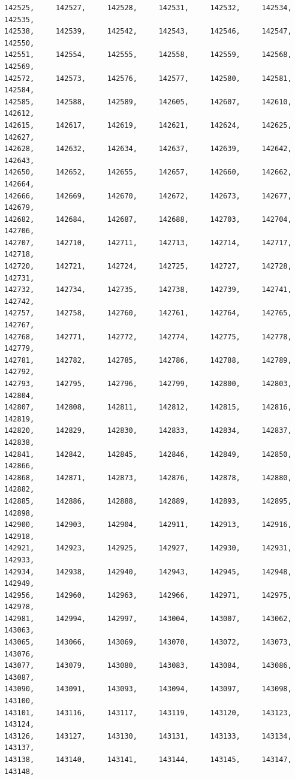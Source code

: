 \documentclass[a4paper,11pt]{report}
\begin{document}
\begin{verbatim}
142525,     142527,     142528,     142531,     142532,     142534,     142535,
142538,     142539,     142542,     142543,     142546,     142547,     142550,
142551,     142554,     142555,     142558,     142559,     142568,     142569,
142572,     142573,     142576,     142577,     142580,     142581,     142584,
142585,     142588,     142589,     142605,     142607,     142610,     142612,
142615,     142617,     142619,     142621,     142624,     142625,     142627,
142628,     142632,     142634,     142637,     142639,     142642,     142643,
142650,     142652,     142655,     142657,     142660,     142662,     142664,
142666,     142669,     142670,     142672,     142673,     142677,     142679,
142682,     142684,     142687,     142688,     142703,     142704,     142706,
142707,     142710,     142711,     142713,     142714,     142717,     142718,
142720,     142721,     142724,     142725,     142727,     142728,     142731,
142732,     142734,     142735,     142738,     142739,     142741,     142742,
142757,     142758,     142760,     142761,     142764,     142765,     142767,
142768,     142771,     142772,     142774,     142775,     142778,     142779,
142781,     142782,     142785,     142786,     142788,     142789,     142792,
142793,     142795,     142796,     142799,     142800,     142803,     142804,
142807,     142808,     142811,     142812,     142815,     142816,     142819,
142820,     142829,     142830,     142833,     142834,     142837,     142838,
142841,     142842,     142845,     142846,     142849,     142850,     142866,
142868,     142871,     142873,     142876,     142878,     142880,     142882,
142885,     142886,     142888,     142889,     142893,     142895,     142898,
142900,     142903,     142904,     142911,     142913,     142916,     142918,
142921,     142923,     142925,     142927,     142930,     142931,     142933,
142934,     142938,     142940,     142943,     142945,     142948,     142949,
142956,     142960,     142963,     142966,     142971,     142975,     142978,
142981,     142994,     142997,     143004,     143007,     143062,     143063,
143065,     143066,     143069,     143070,     143072,     143073,     143076,
143077,     143079,     143080,     143083,     143084,     143086,     143087,
143090,     143091,     143093,     143094,     143097,     143098,     143100,
143101,     143116,     143117,     143119,     143120,     143123,     143124,
143126,     143127,     143130,     143131,     143133,     143134,     143137,
143138,     143140,     143141,     143144,     143145,     143147,     143148,

\end{verbatim}
\end{document}
